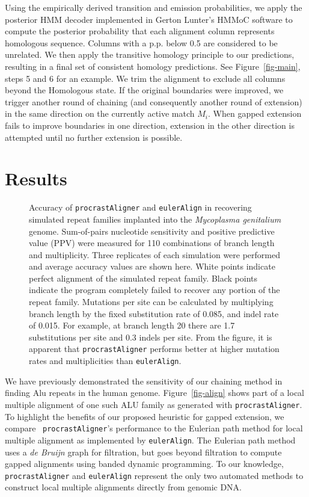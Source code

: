 \documentclass{ws-procs975x65}
\begin{document}
Using the empirically derived transition and emission probabilities,
we apply the posterior HMM decoder implemented in Gerton Lunter's
HMMoC software\cite{hmmoc} to compute the posterior probability that
each alignment column represents homologous sequence.  Columns with a
p.p. below 0.5 are considered to be unrelated.  We then apply the
transitive homology principle to our predictions, resulting in a final
set of consistent homology predictions.  See Figure~\ref{fig-main},
steps 5 and 6 for an example. We trim the alignment to exclude all
columns beyond the Homologous state. If the original boundaries were
improved, we trigger another round of chaining (and consequently
another round of extension) in the same direction on the currently
active match $M_i$.  When gapped extension fails to improve boundaries
in one direction, extension in the other direction is attempted until
no further extension is possible.


\section{Results}
\begin{figure}[t]
\centering {}
\caption{Accuracy of \texttt{procrastAligner} and \texttt{eulerAlign} in
recovering simulated repeat families implanted into the
\textit{Mycoplasma genitalium} genome.  Sum-of-pairs nucleotide
sensitivity and positive predictive value (PPV) were measured for 110
combinations of branch length and multiplicity.  Three replicates of
each simulation were performed and average accuracy values are shown
here.  White points indicate perfect alignment of the simulated repeat
family.  Black points indicate the program completely failed to
recover any portion of the repeat family.  Mutations per site can be
calculated by multiplying branch length by the fixed substitution rate
of 0.085, and indel rate of 0.015.  For example, at branch length 20
there are 1.7 substitutions per site and 0.3 indels per site.  From
the figure, it is apparent that \texttt{procrastAligner} performs better
at higher mutation rates and multiplicities than \texttt{eulerAlign}.}
\label{fig-results}\vspace{-0.2cm}
\end{figure}

We have previously demonstrated the sensitivity of our chaining method
in finding Alu repeats in the human
genome\cite{ref-procrast}. Figure~\ref{fig-align} shows part of a
local multiple alignment of one such ALU family as generated with
\texttt{procrastAligner}. To highlight the benefits of our proposed
heuristic for gapped extension, we compare ~\texttt{procrastAligner}'s
performance to the Eulerian path method for local multiple alignment
as implemented by \texttt{eulerAlign}\cite{ref-related1}. The Eulerian
path method uses a \textit{de Bruijn} graph for filtration, but goes
beyond filtration to compute gapped alignments using banded dynamic
programming.  To our knowledge, \texttt{procrastAligner} and
\texttt{eulerAlign} represent the only two automated methods to
construct local multiple alignments directly from genomic DNA.
\end{document}
